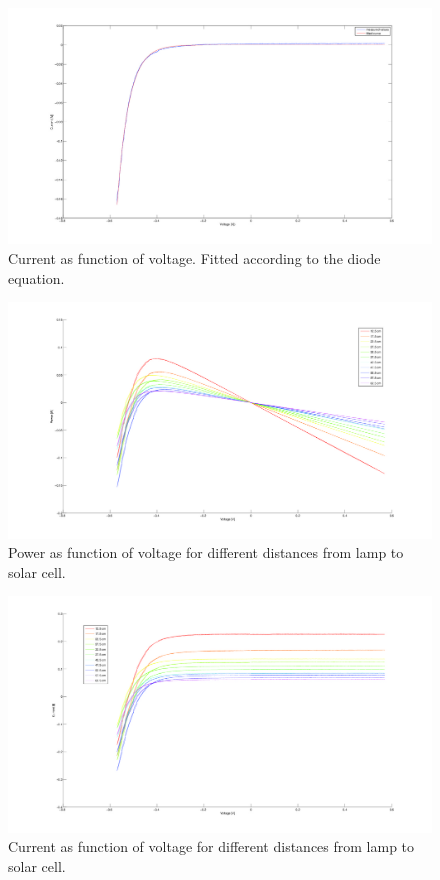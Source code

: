 \documentclass[a4paper]{article}
\begin{document}
\begin{figure}[h!]
  \begin{center}
    \includegraphics[scale=0.2]{IvsUnoIlumination.jpg}
  \end{center}
  \caption{Current as function of voltage. Fitted according to the diode equation.}
\end{figure}
\begin{figure}[h!]
  \begin{center}
    \includegraphics[scale=0.2]{PvsV.jpg}
  \end{center}
  \caption{Power as function of voltage for different distances from lamp to solar cell.}
\end{figure}
\begin{figure}[h!]
  \begin{center}
    \includegraphics[scale=0.2]{IvsU.jpg}
  \end{center}
  \caption{Current as function of voltage for different distances from lamp to solar cell.}
\end{figure}
\end{document}
